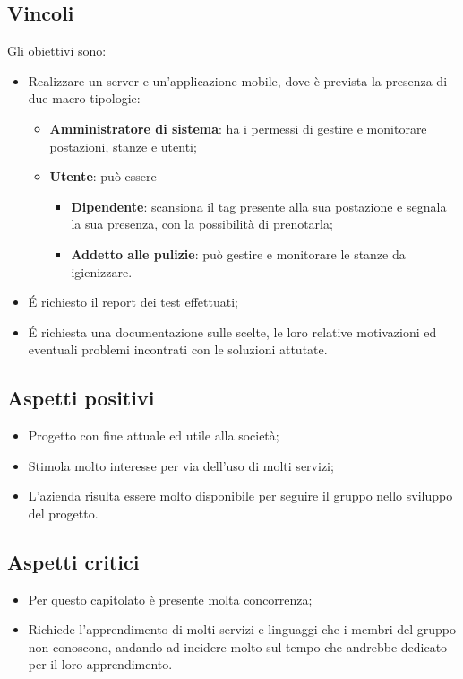 \subsection{Vincoli}
Gli obiettivi sono:
\begin{itemize}
\item	Realizzare un server e un'applicazione mobile, dove è prevista la presenza di due macro-tipologie:
\begin{itemize}
\item	\textbf{Amministratore di sistema}: ha i permessi di gestire e monitorare postazioni, stanze e utenti;
\item	\textbf{Utente}: può essere 

\begin{itemize}
\item \textbf{Dipendente}: scansiona il tag presente alla sua postazione e segnala la sua presenza, con la possibilità di prenotarla;

\item \textbf{Addetto alle pulizie}: può gestire e monitorare le stanze da igienizzare.
\end{itemize}

\end{itemize}
\item	\'E richiesto il report dei test effettuati;
\item	\'E richiesta una documentazione sulle scelte, le loro relative motivazioni ed eventuali problemi incontrati con le soluzioni attutate.
\end{itemize}

\subsection{Aspetti positivi}
\begin{itemize}
\item	Progetto con fine attuale ed utile alla società;
\item	Stimola molto interesse per via dell'uso di molti servizi;
\item	L'azienda risulta essere molto disponibile per seguire il gruppo nello sviluppo del progetto.
\end{itemize}
\subsection{Aspetti critici}
\begin{itemize}
\item	Per questo capitolato è presente molta concorrenza;
\item	Richiede l'apprendimento di molti servizi e linguaggi che i membri del gruppo non conoscono, andando ad incidere molto sul tempo che andrebbe dedicato per il loro apprendimento.
\end{itemize}

